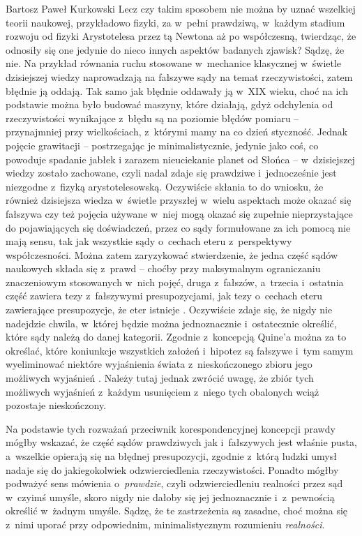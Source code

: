 \begin{artplenv}{Bartosz Paweł Kurkowski}
Lecz czy takim sposobem nie można by uznać wszelkiej teorii naukowej, przykładowo fizyki, za w~pełni prawdziwą, w~każdym
stadium rozwoju od fizyki Arystotelesa przez tą Newtona aż po współczesną, twierdząc, że odnosiły się one jedynie do
nieco innych aspektów badanych zjawisk? Sądzę, że nie. Na przykład równania ruchu stosowane w~mechanice
klasycznej w~świetle dzisiejszej wiedzy naprowadzają na fałszywe sądy na temat rzeczywistości, zatem błędnie ją oddają.
Tak samo jak
błędnie oddawały ją w~XIX wieku, choć na ich podstawie można było budować maszyny, które działają, gdyż odchylenia od
rzeczywistości wynikające z~błędu są na poziomie błędów pomiaru -- przynajmniej przy wielkościach, z~którymi mamy na co
dzień styczność. Jednak pojęcie grawitacji -- postrzegając je minimalistycznie, jedynie jako coś, co powoduje spadanie
jabłek\textit{ }i zarazem nieuciekanie planet od Słońca -- w~dzisiejszej wiedzy zostało zachowane, czyli nadal zdaje się
prawdziwe i~jednocześnie jest niezgodne z~fizyką arystotelesowską. Oczywiście skłania to do wniosku, że również
dzisiejsza wiedza w~świetle przyszłej w~wielu aspektach może okazać się fałszywa czy też pojęcia używane w~niej mogą
okazać się zupełnie nieprzystające do pojawiających się doświadczeń, przez co sądy formułowane za ich pomocą nie mają
sensu, tak jak wszystkie sądy o~cechach eteru z~perspektywy współczesności. Można zatem zaryzykować stwierdzenie, że
jedna część sądów naukowych składa się z~prawd -- choćby przy maksymalnym ograniczaniu znaczeniowym stosowanych w~nich
pojęć, druga z~fałszów, a~trzecia i~ostatnia część zawiera tezy z~fałszywymi presupozycjami, jak tezy o~cechach eteru
zawierające presupozycje, że eter istnieje
\parencite[s.~99]{grobler_metodologia_2006}.
Oczywiście zdaje się, że
nigdy nie nadejdzie chwila, w~której będzie można jednoznacznie i~ostatecznie określić, które sądy należą do danej
kategorii. Zgodnie z~koncepcją Quine’a można za to określać, które koniunkcje wszystkich założeń i~hipotez są fałszywe
i~tym samym wyeliminować niektóre wyjaśnienia świata z~nieskończonego zbioru jego możliwych wyjaśnień
\parencite[s.~77]{grobler_metodologia_2006}.
Należy tutaj jednak zwrócić uwagę, że zbiór tych możliwych
wyjaśnień z~każdym usunięciem z~niego tych obalonych wciąż pozostaje nieskończony.


Na podstawie tych rozważań przeciwnik korespondencyjnej koncepcji prawdy mógłby wskazać, że część sądów prawdziwych
jak i~fałszywych jest właśnie pusta, a~wszelkie opierają się na błędnej presupozycji, zgodnie z~którą ludzki umysł nadaje
się do jakiegokolwiek odzwierciedlenia rzeczywistości. Ponadto mógłby podważyć sens mówienia o~\textit{prawdzie}, czyli
odzwierciedleniu realności przez sąd w~czyimś umyśle, skoro nigdy nie dałoby się jej jednoznacznie i~z~pewnością
określić w~żadnym umyśle. Sądzę, że te zastrzeżenia są zasadne, choć można się z~nimi uporać przy odpowiednim,
minimalistycznym rozumieniu \textit{realności}.


\end{artplenv}
